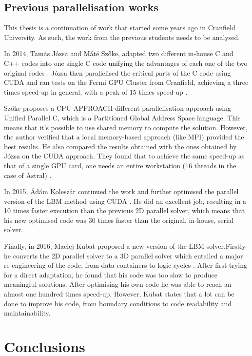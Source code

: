 \documentclass[12pt]{book}
\begin{document}
\section{Previous parallelisation works}
This thesis is a continuation of work that started some years ago in Cranfield University. As such, the work from the previous students needs to be analysed. \par
In 2014, Tamás Józsa and Máté Szőke, adapted two different in-house C and C++ codes into one single C code unifying the advantages of each one of the two original codes \cite{jozsa_thesis,szoke_thesis}. Józsa then parallelised the critical parts of the C code using CUDA and ran tests on the Fermi GPU Cluster from Cranfield, achieving a three times speed-up in general, with a peak of 15 times speed-up \cite{jozsa_thesis}. \par
Szőke proposes a CPU APPROACH different parallelisation approach using Unified Parallel C, which is a Partitioned Global Address Space language\cite{szoke_thesis}. This means that it’s possible to use shared memory to compute the solution. However, the author verified that a local memory-based approach (like MPI) provided the best results. He also compared the results obtained with the ones obtained by Józsa on the CUDA approach. They found that to achieve the same speed-up as that of a single GPU card, one needs an entire workstation (16 threads in the case of Astral) \cite{szoke_thesis}.\par
In 2015, Ádám Koleszár continued the work and further optimised the parallel version of the LBM method using CUDA \cite{koleszar_thesis}. He did an excellent job, resulting in a 10 times faster execution than the previous 2D parallel solver, which means that his new optimised code was 30 times faster than the original, in-house, serial solver.\par
Finally, in 2016, Maciej Kubat proposed a new version of the LBM solver.Firstly he converts the 2D parallel solver to a 3D parallel solver which entailed a major re-engineering of the code, from data containers to logic cycles \cite{maciej_thesis}. After first trying for a direct adaptation, he found that his code was too slow to produce meaningful solutions. After optimising his own code he was able to reach an almost one hundred times speed-up.
However, Kubat states that a lot can be done to improve his code, from boundary conditions to code readability and maintainability. 

\chapter{Conclusions}

%

\appendix

{}

\end{document}
